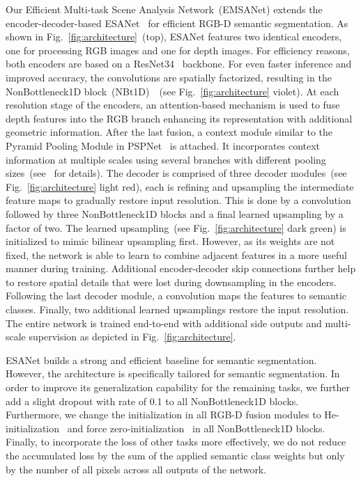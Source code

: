 \documentclass[conference]{IEEEtran}
\begin{document}
Our Efficient Multi-task Scene Analysis Network~(EMSANet) extends the encoder-decoder-based ESANet~\cite{esanet2021icra} for efficient RGB-D semantic segmentation.
As shown in Fig.~\ref{fig:architecture}~(top), ESANet features two identical encoders, one for processing RGB images and one for depth images.
For efficiency reasons, both encoders are based on a ResNet34~\cite{ResNet-cvpr2016} backbone.
For even faster inference and improved accuracy, the  convolutions are spatially factorized, resulting in the NonBottleneck1D block~(NBt1D)~\cite{ERFNet-its2018}~(see Fig.~\ref{fig:architecture} violet).
At each resolution stage of the encoders, an attention-based mechanism is used to fuse depth features into the RGB branch enhancing its representation with additional geometric information.
After the last fusion, a context module similar to the Pyramid Pooling Module in PSPNet~\cite{PSPNet-cvpr2017} is attached.
It incorporates context information at multiple scales using several branches with different pooling sizes~(see~\cite{esanet2021icra} for details).
The decoder is comprised of three decoder modules~(see Fig.~\ref{fig:architecture} light red), each is refining and upsampling the intermediate feature maps to gradually restore input resolution.
This is done by a  convolution followed by three NonBottleneck1D blocks and a final learned upsampling by a factor of two.
The learned upsampling~(see Fig.~\ref{fig:architecture} dark green) is initialized to mimic bilinear upsampling first.
However, as its weights are not fixed, the network is able to learn to combine adjacent features in a more
useful manner during training.
Additional encoder-decoder skip connections further help to restore spatial details that were lost during downsampling in the encoders.
Following the last decoder module, a  convolution maps the features to semantic classes.
Finally, two additional learned upsamplings restore the input resolution.
The entire network is trained end-to-end with additional side outputs and multi-scale supervision as depicted in Fig.~\ref{fig:architecture}.

ESANet builds a strong and efficient baseline for semantic segmentation. 
However, the architecture is specifically tailored for semantic segmentation. 
In order to improve its generalization capability for the remaining tasks, we further add a slight dropout with rate of 0.1 to all NonBottleneck1D blocks. 
Furthermore, we change the initialization in all \mbox{RGB-D} fusion modules to He-initialization~\cite{HeInit-iccv2015} and force zero-initialization~\cite{ZeroInit-arxiv2017} in all NonBottleneck1D blocks.
Finally, to incorporate the loss of other tasks more effectively, we do not reduce the accumulated loss by the sum of the applied semantic class weights but only by the number of all pixels across all outputs of the network.
\end{document}
